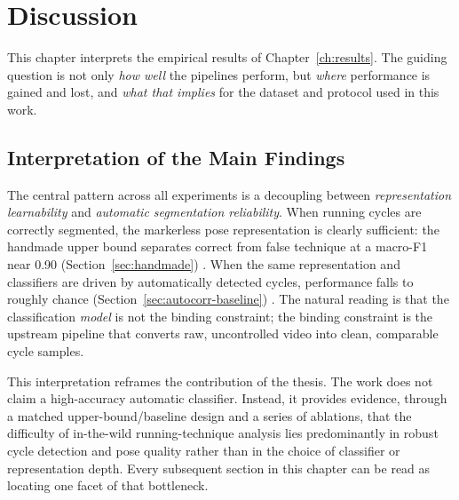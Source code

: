 %

\chapter{Discussion}
\label{ch:discussion}

This chapter interprets the empirical results of Chapter~\ref{ch:results}. The
guiding question is not only \emph{how well} the pipelines perform, but
\emph{where} performance is gained and lost, and \emph{what that implies} for
the dataset and protocol used in this work.

\section{Interpretation of the Main Findings}
\label{sec:disc-main}

The central pattern across all experiments is a decoupling between
\emph{representation learnability} and \emph{automatic segmentation
reliability}. When running cycles are correctly segmented, the markerless pose
representation is clearly sufficient: the handmade upper bound separates
correct from false technique at a macro-F1 near 0.90
(Section~\ref{sec:handmade}) . When the same representation and classifiers are
driven by automatically detected cycles, performance falls to roughly chance
(Section~\ref{sec:autocorr-baseline}) . The natural reading is that the
classification \emph{model} is not the binding constraint; the binding
constraint is the upstream pipeline that converts raw, uncontrolled video into
clean, comparable cycle samples. 

This interpretation reframes the contribution of the thesis. The work does not
claim a high-accuracy automatic classifier. Instead, it provides evidence,
through a matched upper-bound/baseline design and a series of ablations, that
the difficulty of in-the-wild running-technique analysis lies predominantly in
robust cycle detection and pose quality rather than in the choice of classifier
or representation depth. Every subsequent section in this chapter can be read
as locating one facet of that bottleneck.


